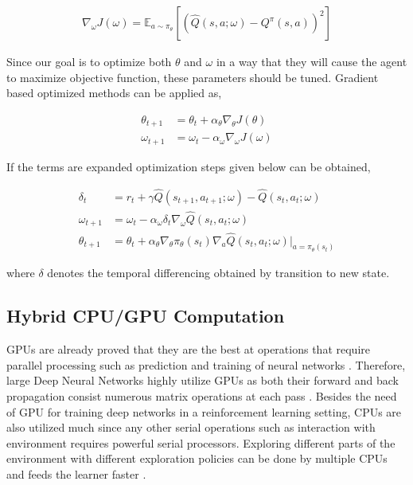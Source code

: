 \documentclass{ituphdreport}
\begin{document}
\begin{align}
	\label{eq:abc}
	\nabla_\omega J(\omega) =  \mathbb{E}_{a \sim \pi_\theta}[(\hat{Q}(s,a;\omega) - Q^\pi(s,a))^2]
\end{align}
\fi

Since our goal is to optimize both $\theta$ and $\omega$ in a way that they will cause the agent to maximize objective function, these parameters should be tuned. Gradient based optimized methods can be applied as,

\begin{align}
\label{eq:abc}
\theta_{t+1} &= \theta_t + \alpha_{\theta} \nabla_\theta J(\theta) \\
\omega_{t+1} &= \omega_t - \alpha_{\omega} \nabla_\omega J(\omega)
\end{align}

If the terms are expanded optimization steps given below can be obtained,

\begin{align}
	\label{eq:abc}
	\delta_t &= r_t + \gamma \hat{Q}(s_{t+1},a_{t+1};\omega)  - \hat{Q}(s_t,a_t;\omega) \\
	\omega_{t+1} &= \omega_t - \alpha_{\omega} \delta_t \nabla_\omega \hat{Q}(s_t,a_t;\omega) \\
	\theta_{t+1} &= \theta_t + \alpha_{\theta} \nabla_{\theta} \pi_\theta (s_t) \nabla_a \hat{Q}(s_t,a_t;\omega)|_{a=\pi_\theta (s_t)}
\end{align}

where $\delta$ denotes the temporal differencing obtained by transition to new state.

\subsection{Hybrid CPU/GPU Computation} \label{sec:hybridcomputation}
GPUs are already proved that they are the best at operations that require parallel processing such as prediction and training of neural networks \cite{rizvi2017optimized}. Therefore, large Deep Neural Networks highly utilize GPUs as both their forward and back propagation consist numerous matrix operations at each pass \cite{babaeizadeh2016ga3c}. Besides the need of GPU for training deep networks in a reinforcement learning setting, CPUs are also utilized much since any other serial operations such as interaction with environment requires powerful serial processors. Exploring different parts of the environment with different exploration policies can be done by multiple CPUs and feeds the learner faster \cite{mnih2016asynchronous}. 
\end{document}
